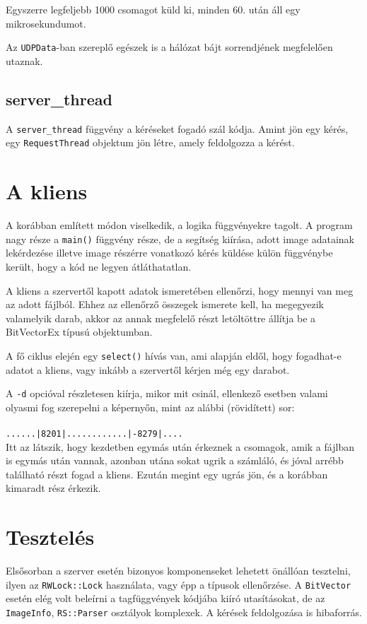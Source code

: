 \documentclass[fleqn,10pt,a4paper,titlepage]{article}
\begin{document}
  Egyszerre legfeljebb 1000 csomagot küld ki, minden 60. után áll egy mikrosekundumot.

  Az \texttt{UDPData}-ban szereplő egészek is a hálózat bájt sorrendjének megfelelően utaznak.
  
  \subsection{server\_thread}
  A \texttt{server\_thread} függvény a kéréseket fogadó szál kódja. Amint jön egy kérés, egy \texttt{RequestThread} objektum jön
  létre, amely feldolgozza a kérést.
  
  \newpage
  \section{A kliens}
  A korábban említett módon viselkedik, a logika függvényekre tagolt. A program nagy része a \texttt{main()} függvény
  része, de a segítség kiírása, adott image adatainak lekérdezése illetve image részérre vonatkozó kérés küldése külön
  függvénybe került, hogy a kód ne legyen átláthatatlan.
  
  A kliens a szervertől kapott adatok ismeretében ellenőrzi, hogy mennyi van meg az adott fájlból. Ehhez az ellenőrző
  összegek ismerete kell, ha megegyezik valamelyik darab, akkor az annak megfelelő részt letöltöttre állítja be a
  BitVectorEx típusú objektumban. 

  A fő ciklus elején egy \texttt{select()} hívás van, ami alapján eldől, hogy fogadhat-e adatot a kliens, vagy inkább a
  szervertől kérjen még egy darabot.
  
  A \texttt{-d} opcióval részletesen kiírja, mikor mit csinál, ellenkező esetben valami olyasmi fog szerepelni a
  képernyőn, mint az alábbi (rövidített) sor:\\\\  
  \texttt{......|8201|............|-8279|....}\\
  
  Itt az látszik, hogy kezdetben egymás után érkeznek a csomagok, amik a fájlban is egymás után vannak, azonban utána
  sokat ugrik a számláló, és jóval arrébb található részt fogad a kliens. Ezután megint egy ugrás jön, és a korábban
  kimaradt rész érkezik.
  
  \newpage
  \section{Tesztelés}
  Elsősorban a szerver esetén bizonyos komponenseket lehetett önállóan tesztelni, ilyen az \texttt{RWLock::Lock}
  használata, vagy épp a típusok ellenőrzése. A \texttt{BitVector} esetén elég volt beleírni a tagfüggvények kódjába
  kiíró utasításokat, de az \texttt{ImageInfo}, \texttt{RS::Parser} osztályok komplexek. A kérések feldolgozása is hibaforrás.
\end{document}
